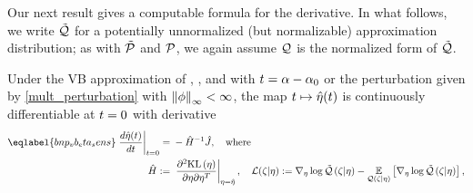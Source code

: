 Our next result gives a computable formula for the derivative. In what follows,
we write $\tilde{\mathcal{Q}}$ for a potentially unnormalized (but normalizable) approximation
distribution; as with $\tilde{\mathcal{P}}$ and $\mathcal{P}$, we again assume $\mathcal{Q}$ is the normalized
form of $\tilde{\mathcal{Q}}$.
%
\begin{thm}
%
%
Under the VB approximation of , , and with
$t = \alpha - \alpha_0$ or the perturbation given by \eqref{mult_perturbation}
with $\left\Vert\phi\right\Vert_{\infty} < \infty$, the map $t \mapsto \hat\eta(t)$ is continuously
differentiable at $t=0$ with derivative
%
\begin{align}
%
\eqlabel{bnp_vb_eta_sens}
\fracat{d \etaopt(\t)}{d \t}{\t=0} ={}&
    - \hessopt^{-1} \crosshessian, \mathwhere \\
%
\hessopt :={}& \fracat{\partial^2 \KL{\eta}}
                      {\partial \eta \partial \eta^T}
                      {\eta = \etaopt},
\quad \lqgradbar{\zeta \vert \eta} :={}
    \lqgrad{\zeta \vert \eta} -
    \expect{\q(\zeta \vert \eta)}{\lqgrad{\zeta \vert \eta}}, \\

\end{align}
\end{thm}
